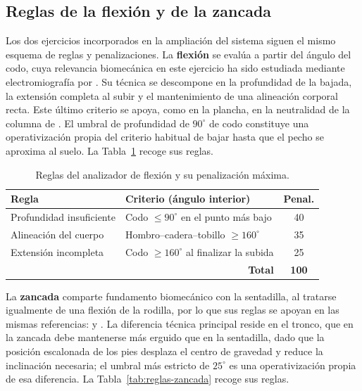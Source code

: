 \documentclass[12pt,a4paper,twoside,openright]{book}
\begin{document}
    \subsection{Reglas de la flexión y de la zancada}

    Los dos ejercicios incorporados en la ampliación del sistema siguen el mismo
    esquema de reglas y penalizaciones. La \textbf{flexión} se evalúa a partir
    del ángulo del codo, cuya relevancia biomecánica en este ejercicio ha sido
    estudiada mediante electromiografía por \textcite{sanjuan2015}. Su técnica se
    descompone en la profundidad de la bajada, la extensión completa al subir y
    el mantenimiento de una alineación corporal recta. Este último criterio se apoya,
    como en la plancha, en la neutralidad de la columna de \textcite{mcgill2015}.
    El umbral de profundidad de $90^\circ$ de codo
    constituye una operativización propia del criterio habitual de bajar hasta
    que el pecho se aproxima al suelo. La Tabla~\ref{tab:reglas-flexion} recoge
    sus reglas.

    \begin{table}[htbp]
        \centering
        \small
        \begin{tabular}{p{4.6cm} p{5.2cm} c}
            \toprule
            \textbf{Regla} & \textbf{Criterio (ángulo interior)} & \textbf{Penal.} \\
            \midrule
            Profundidad insuficiente & Codo $\le 90^\circ$ en el punto más bajo & 40 \\
            Alineación del cuerpo    & Hombro--cadera--tobillo $\ge 160^\circ$   & 35 \\
            Extensión incompleta     & Codo $\ge 160^\circ$ al finalizar la subida & 25 \\
            \midrule
            \multicolumn{2}{r}{\textbf{Total}} & \textbf{100} \\
            \bottomrule
        \end{tabular}
        \caption{Reglas del analizador de flexión y su penalización máxima.}
        \label{tab:reglas-flexion}
    \end{table}

    La \textbf{zancada} comparte fundamento biomecánico con la sentadilla, al
    tratarse igualmente de una flexión de la rodilla, por lo que sus reglas
    se apoyan en las mismas referencias: \textcite{escamilla2001} y \textcite{han2017}.
    La diferencia técnica principal reside en el tronco,
    que en la zancada debe mantenerse más erguido que en la sentadilla, dado que
    la posición escalonada de los pies desplaza el centro de gravedad y reduce la
    inclinación necesaria; el umbral más estricto de $25^\circ$ es una
    operativización propia de esa diferencia. La Tabla~\ref{tab:reglas-zancada}
    recoge sus reglas.
\end{document}
